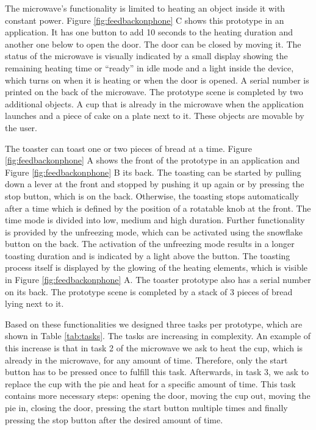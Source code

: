 \documentclass[11pt, a4paper]{article}
\begin{document}
			The microwave's functionality is limited to heating an object inside it with constant power. Figure \ref{fig:feedbackonphone} C shows this prototype in an application. It has one button to add 10 seconds to the heating duration and another one below to open the door. The door can be closed by moving it. The status of the microwave is visually indicated by a small display showing the remaining heating time or ``ready'' in idle mode and a light inside the device, which turns on when it is heating or when the door is opened. A serial number is printed on the back of the microwave. The prototype scene is completed by two additional objects. A cup that is already in the microwave when the application launches and a piece of cake on a plate next to it. These objects are movable by the user.

			The toaster can toast one or two pieces of bread at a time. Figure \ref{fig:feedbackonphone} A shows the front of the prototype in an application and Figure \ref{fig:feedbackonphone} B its back. The toasting can be started by pulling down a lever at the front and stopped by pushing it up again or by pressing the stop button, which is on the back. Otherwise, the toasting stops automatically after a time which is defined by the position of a rotatable knob at the front. The time mode is divided into low, medium and high duration. Further functionality is provided by the unfreezing mode, which can be activated using the snowflake button on the back. The activation of the unfreezing mode results in a longer toasting duration and is indicated by a light above the button. The toasting process itself is displayed by the glowing of the heating elements, which is visible in Figure \ref{fig:feedbackonphone} A. The toaster prototype also has a serial number on its back. The prototype scene is completed by a stack of 3 pieces of bread lying next to it. 
			
			Based on these functionalities we designed three tasks per prototype, which are shown in Table \ref{tab:tasks}. The tasks are increasing in complexity. An example of this increase is that in task 2 of the microwave we ask to heat the cup, which is already in the microwave, for any amount of time. Therefore, only the start button has to be pressed once to fulfill this task. Afterwards, in task 3, we ask to replace the cup with the pie and heat for a specific amount of time. This task contains more necessary steps: opening the door, moving the cup out, moving the pie in, closing the door, pressing the start button multiple times and finally pressing the stop button after the desired amount of time. 
\end{document}

